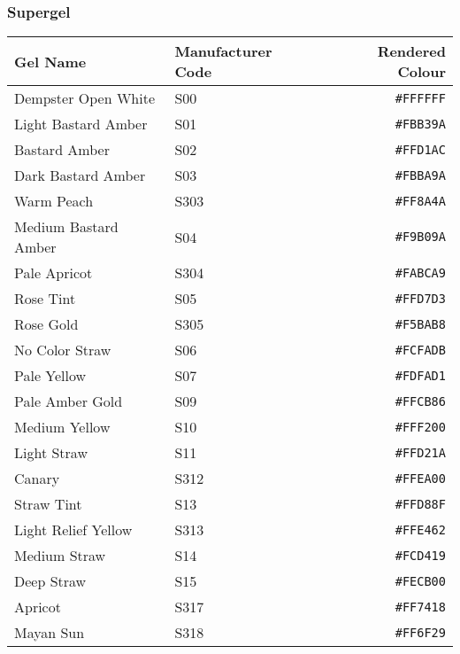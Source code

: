 \documentclass[a4paper]{article}
\begin{document}
\subsubsection{Supergel}
\begin{longtable}{|l|l|r|}
\hline
Gel Name & Manufacturer Code & Rendered Colour \\ \hline
Dempster Open White & S00 & \texttt{\#FFFFFF} \cellcolor[HTML]{FFFFFF} \\
Light Bastard Amber & S01 & \texttt{\#FBB39A} \cellcolor[HTML]{FBB39A} \\
Bastard Amber & S02 & \texttt{\#FFD1AC} \cellcolor[HTML]{FFD1AC} \\
Dark Bastard Amber & S03 & \texttt{\#FBBA9A} \cellcolor[HTML]{FBBA9A} \\
Warm Peach & S303 & \texttt{\#FF8A4A} \cellcolor[HTML]{FF8A4A} \\
Medium Bastard Amber & S04 & \texttt{\#F9B09A} \cellcolor[HTML]{F9B09A} \\
Pale Apricot & S304 & \texttt{\#FABCA9} \cellcolor[HTML]{FABCA9} \\
Rose Tint & S05 & \texttt{\#FFD7D3} \cellcolor[HTML]{FFD7D3} \\
Rose Gold & S305 & \texttt{\#F5BAB8} \cellcolor[HTML]{F5BAB8} \\
No Color Straw & S06 & \texttt{\#FCFADB} \cellcolor[HTML]{FCFADB} \\
Pale Yellow  & S07 & \texttt{\#FDFAD1} \cellcolor[HTML]{FDFAD1} \\
Pale Amber Gold & S09 & \texttt{\#FFCB86} \cellcolor[HTML]{FFCB86} \\
Medium Yellow & S10 & \texttt{\#FFF200} \cellcolor[HTML]{FFF200} \\
Light Straw & S11 & \texttt{\#FFD21A} \cellcolor[HTML]{FFD21A} \\
Canary & S312 & \texttt{\#FFEA00} \cellcolor[HTML]{FFEA00} \\
Straw Tint  & S13 & \texttt{\#FFD88F} \cellcolor[HTML]{FFD88F} \\
Light Relief Yellow & S313 & \texttt{\#FFE462} \cellcolor[HTML]{FFE462} \\
Medium Straw & S14 & \texttt{\#FCD419} \cellcolor[HTML]{FCD419} \\
Deep Straw  & S15 & \texttt{\#FECB00} \cellcolor[HTML]{FECB00} \\
Apricot & S317 & \texttt{\#FF7418} \cellcolor[HTML]{FF7418} \\
Mayan Sun & S318 & \texttt{\#FF6F29} \cellcolor[HTML]{FF6F29} \\

\end{longtable}
\end{document}
